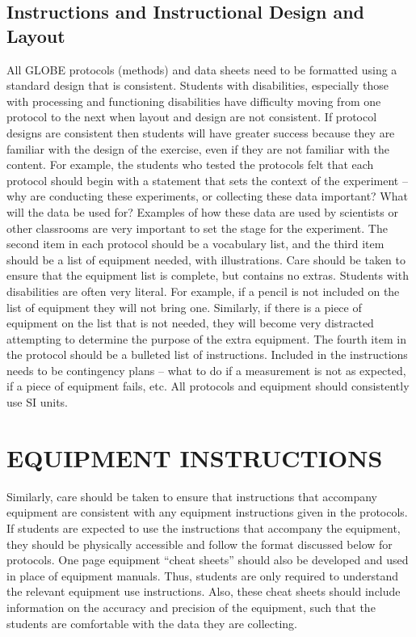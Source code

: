 \documentclass[11.5pt]{sig-alternate} %
\begin{document}
\begin{large}
\subsection*{Instructions and Instructional Design and Layout}

All GLOBE protocols (methods) and data sheets need to be formatted using a standard design that is consistent. Students with disabilities, especially those with processing and functioning disabilities have difficulty moving from one protocol to the next when layout and design are not consistent. If protocol designs are consistent then students will have greater success because they are familiar with the design of the exercise, even if they are not familiar with the content. For example, the students who tested the protocols felt that each protocol should begin with a statement that sets the context of the experiment – why are conducting these experiments, or collecting these data important? What will the data be used for? Examples of how these data are used by scientists or other classrooms are very important to set the stage for the experiment. The second item in each protocol should be a vocabulary list, and the third item should be a list of equipment needed, with illustrations. Care should be taken to ensure that the equipment list is complete, but contains no extras. Students with disabilities are often very literal. For example, if a pencil is not included on the list of equipment they will not bring one. Similarly, if there is a piece of equipment on the list that is not needed, they will become very distracted attempting to determine the purpose of the extra equipment. The fourth item in the protocol should be a bulleted list of instructions. Included in the instructions needs to be contingency plans – what to do if a measurement is not as expected, if a piece of equipment fails, etc. All protocols and equipment should consistently use SI units. 

\section*{EQUIPMENT INSTRUCTIONS}

Similarly, care should be taken to ensure that instructions that accompany equipment are consistent with any equipment instructions given in the protocols. If students are expected to use the instructions that accompany the equipment, they should be physically accessible and follow the format discussed below for protocols. One page equipment “cheat sheets” should also be developed and used in place of equipment manuals. Thus, students are only required to understand the relevant equipment use instructions. Also, these cheat sheets should include information on the accuracy and precision of the equipment, such that the students are comfortable with the data they are collecting.


\end{large}
\end{document}
